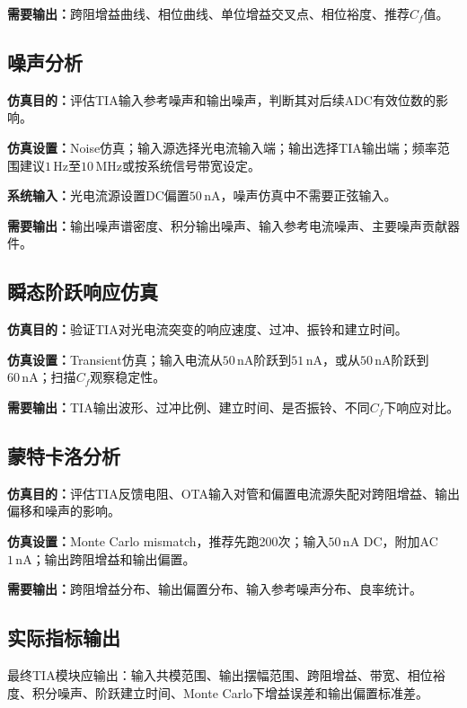 \documentclass[12pt,a4paper]{ctexart}
\begin{document}
\textbf{需要输出：}跨阻增益曲线、相位曲线、单位增益交叉点、相位裕度、推荐$C_f$值。

\subsection{噪声分析}

\textbf{仿真目的：}评估TIA输入参考噪声和输出噪声，判断其对后续ADC有效位数的影响。

\textbf{仿真设置：}Noise仿真；输入源选择光电流输入端；输出选择TIA输出端；频率范围建议$1\,\mathrm{Hz}$至$10\,\mathrm{MHz}$或按系统信号带宽设定。

\textbf{系统输入：}光电流源设置DC偏置$50\,\mathrm{nA}$，噪声仿真中不需要正弦输入。

\textbf{需要输出：}输出噪声谱密度、积分输出噪声、输入参考电流噪声、主要噪声贡献器件。

\subsection{瞬态阶跃响应仿真}

\textbf{仿真目的：}验证TIA对光电流突变的响应速度、过冲、振铃和建立时间。

\textbf{仿真设置：}Transient仿真；输入电流从$50\,\mathrm{nA}$阶跃到$51\,\mathrm{nA}$，或从$50\,\mathrm{nA}$阶跃到$60\,\mathrm{nA}$；扫描$C_f$观察稳定性。

\textbf{需要输出：}TIA输出波形、过冲比例、建立时间、是否振铃、不同$C_f$下响应对比。

\subsection{蒙特卡洛分析}

\textbf{仿真目的：}评估TIA反馈电阻、OTA输入对管和偏置电流源失配对跨阻增益、输出偏移和噪声的影响。

\textbf{仿真设置：}Monte Carlo mismatch，推荐先跑200次；输入$50\,\mathrm{nA}$ DC，附加AC $1\,\mathrm{nA}$；输出跨阻增益和输出偏置。

\textbf{需要输出：}跨阻增益分布、输出偏置分布、输入参考噪声分布、良率统计。

\subsection{实际指标输出}

最终TIA模块应输出：输入共模范围、输出摆幅范围、跨阻增益、带宽、相位裕度、积分噪声、阶跃建立时间、Monte Carlo下增益误差和输出偏置标准差。
\end{document}
